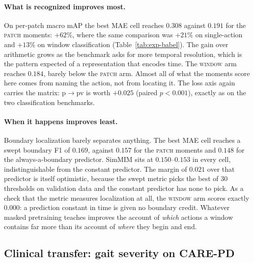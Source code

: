 \paragraph{What is recognized improves most.} On per-patch macro mAP the best MAE cell
reaches $0.308$ against $0.191$ for the \textsc{patch} moments: $+62\%$, where the same
comparison was $+21\%$ on single-action and $+13\%$ on window classification
(Table~\ref{tab:exp-babel}). The gain over arithmetic grows as the benchmark asks for more
temporal resolution, which is the pattern expected of a representation that encodes time.
The \textsc{window} arm reaches $0.184$, barely below the \textsc{patch} arm. Almost all of
what the moments score here comes from naming the action, not from locating it. The loss
axis again carries the matrix: \textsf{p}$\to$\textsf{pv} is worth $+0.025$ (paired
$p<0.001$), exactly as on the two classification benchmarks.

\paragraph{When it happens improves least.} Boundary localization barely separates
anything. The best MAE cell reaches a swept boundary F1 of $0.169$, against $0.157$ for the
\textsc{patch} moments and $0.148$ for the always-a-boundary predictor. SimMIM sits at
$0.150$--$0.153$ in every cell, indistinguishable from the constant predictor. The margin
of $0.021$ over that predictor is itself optimistic, because the swept metric picks the
best of $30$ thresholds on validation data and the constant predictor has none to pick. As a check that the
metric measures localization at all, the \textsc{window} arm scores exactly $0.000$: a
prediction constant in time is given no boundary credit. Whatever masked pretraining
teaches improves the account of \emph{which} actions a window contains far more than its
account of \emph{where} they begin and end.

\subsection{Clinical transfer: gait severity on CARE-PD}
\label{sec:exp-carepd}

